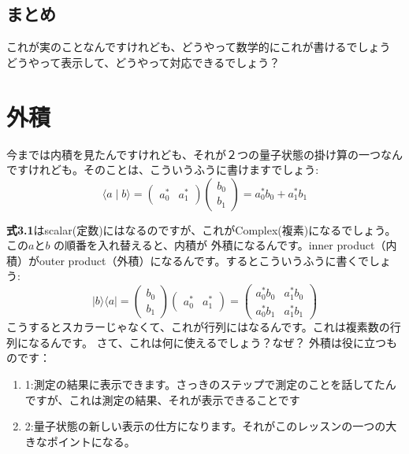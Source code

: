 \subsection{まとめ}
これが実のことなんですけれども、どうやって数学的にこれが書けるでしょう
どうやって表示して、どうやって対応できるでしょう？

\section{外積}
今までは内積を見たんですけれども、それが２つの量子状態の掛け算の一つなんですけれども。そのことは、こういうふうに書けますでしょう:
\begin{equation}
\langle a \mid b\rangle=\left(\begin{array}{ll}
a_{0}^{*} & a_{1}^{*}
\end{array}\right)\left(\begin{array}{l}
b_{0} \\
b_{1}
\end{array}\right)=a_{0}^{*} b_{0}+a_{1}^{*} b_{1}
\end{equation}

\textbf{式3.1}はscalar(定数)にはなるのですが、これがComplex(複素)になるでしょう。この$a$と$b$ の順番を入れ替えると、内積が
外積になるんです。inner product（内積）がouter product（外積）になるんです。するとこういうふうに書くでしょう:
\begin{equation}
|b\rangle\langle a|=\left(\begin{array}{l}
b_{0} \\
b_{1}
\end{array}\right)\left(\begin{array}{ll}
a_{0}^{*} & a_{1}^{*}
\end{array}\right)=\left(\begin{array}{ll}
a_{0}^{*} b_{0} & a_{1}^{*} b_{0} \\
a_{0}^{*} b_{1} & a_{1}^{*} b_{1}
\end{array}\right)
\end{equation}
こうするとスカラーじゃなくて、これが行列にはなるんです。これは複素数の行列になるんです。
さて、これは何に使えるでしょう？なぜ？
外積は役に立つものです：
\begin{enumerate}
    \item 1:測定の結果に表示できます。さっきのステップで測定のことを話してたんですが、これは測定の結果、それが表示できることです
    \item 2:量子状態の新しい表示の仕方になります。それがこのレッスンの一つの大きなポイントになる。
\end{enumerate}

